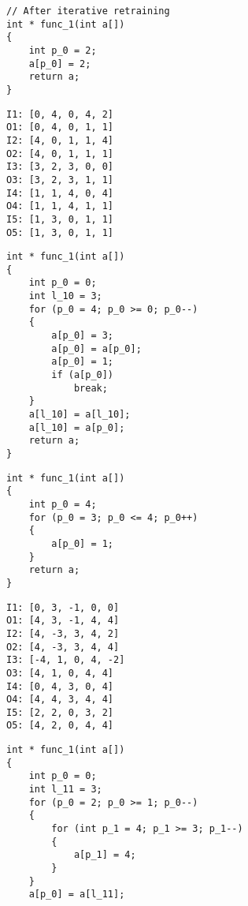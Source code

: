 \begin{figure}
\begin{minipage}{0.33\textwidth}
\begin{verbatim}
// After iterative retraining
int * func_1(int a[])
{
    int p_0 = 2;
    a[p_0] = 2;
    return a;
}
\end{verbatim}
\end{minipage}
\par\vspace{3mm}
\begin{minipage}{0.25\textwidth}
\begin{verbatim}
I1: [0, 4, 0, 4, 2]
O1: [0, 4, 0, 1, 1]
I2: [4, 0, 1, 1, 4]
O2: [4, 0, 1, 1, 1]
I3: [3, 2, 3, 0, 0]
O3: [3, 2, 3, 1, 1]
I4: [1, 1, 4, 0, 4]
O4: [1, 1, 4, 1, 1]
I5: [1, 3, 0, 1, 1]
O5: [1, 3, 0, 1, 1]
\end{verbatim}
\end{minipage}
\begin{minipage}{0.40\textwidth}
\begin{verbatim}
int * func_1(int a[])
{
    int p_0 = 0;
    int l_10 = 3;
    for (p_0 = 4; p_0 >= 0; p_0--)
    {
        a[p_0] = 3;
        a[p_0] = a[p_0];
        a[p_0] = 1;
        if (a[p_0])
            break;
    }
    a[l_10] = a[l_10];
    a[l_10] = a[p_0];
    return a;
}
\end{verbatim}
\end{minipage}
\begin{minipage}{0.33\textwidth}
\begin{verbatim}
int * func_1(int a[])
{
    int p_0 = 4;
    for (p_0 = 3; p_0 <= 4; p_0++)
    {
        a[p_0] = 1;
    }
    return a;
}
\end{verbatim}
\end{minipage}
\par\vspace{3mm}
\begin{minipage}{0.25\textwidth}
\begin{verbatim}
I1: [0, 3, -1, 0, 0]
O1: [4, 3, -1, 4, 4]
I2: [4, -3, 3, 4, 2]
O2: [4, -3, 3, 4, 4]
I3: [-4, 1, 0, 4, -2]
O3: [4, 1, 0, 4, 4]
I4: [0, 4, 3, 0, 4]
O4: [4, 4, 3, 4, 4]
I5: [2, 2, 0, 3, 2]
O5: [4, 2, 0, 4, 4]
\end{verbatim}
\end{minipage}
\begin{minipage}{0.40\textwidth}
\begin{verbatim}
int * func_1(int a[])
{
    int p_0 = 0;
    int l_11 = 3;
    for (p_0 = 2; p_0 >= 1; p_0--)
    {
        for (int p_1 = 4; p_1 >= 3; p_1--)
        {
            a[p_1] = 4;
        }
    }
    a[p_0] = a[l_11];

\end{verbatim}
\end{minipage}
\end{figure}
